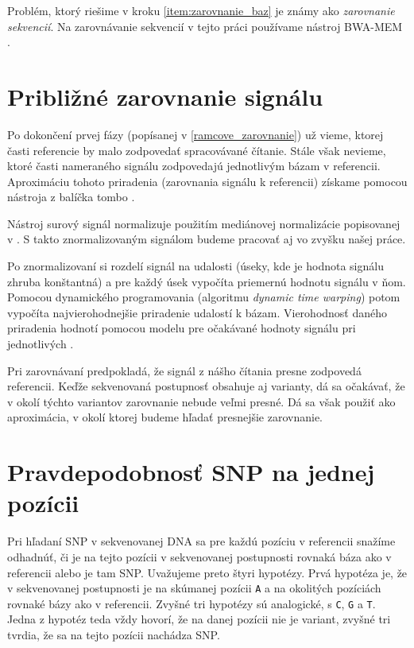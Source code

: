 Problém, ktorý riešime v kroku \ref{item:zarovnanie_baz} je známy ako
\emph{zarovnanie sekvencií}. Na zarovnávanie sekvencií v tejto práci používame
nástroj BWA-MEM \cite{BWA-MEM}.

\section{Približné zarovnanie signálu}
\label{sec:resquiggle}

Po dokončení prvej fázy (popísanej v \ref{ramcove_zarovnanie}) už vieme, ktorej časti referencie
by malo zodpovedať spracovávané čítanie. Stále však nevieme, ktoré časti nameraného signálu
zodpovedajú jednotlivým bázam v referencii. Aproximáciu tohoto priradenia (zarovnania signálu k 
referencii)
získame pomocou nástroja \resquiggle{} z balíčka tombo \cite{tombo}. 

Nástroj \resquiggle{} surový signál normalizuje použitím mediánovej normalizácie popisovanej 
v \cite{Stoiber2017}. S takto znormalizovaným signálom budeme pracovať aj vo zvyšku našej práce.

Po znormalizovaní si \resquiggle{} rozdelí signál na udalosti (úseky, kde je hodnota signálu zhruba
konštantná) a pre každý úsek vypočíta priemernú hodnotu signálu v ňom.
Pomocou dynamického programovania (algoritmu \emph{dynamic time warping}) potom vypočíta 
najvierohodnejšie priradenie udalostí k bázam. 
Vierohodnosť daného priradenia hodnotí pomocou modelu pre očakávané hodnoty signálu pri
jednotlivých  \cite{resquiggle}.


Pri zarovnávaní \resquiggle{} predpokladá, že signál z nášho čítania presne zodpovedá referencii.
Keďže sekvenovaná postupnosť obsahuje aj varianty, dá sa očakávať, že v okolí týchto variantov
zarovnanie nebude veľmi presné. Dá sa však použiť ako aproximácia, v okolí ktorej budeme hľadať
presnejšie zarovnanie.

\section{Pravdepodobnosť SNP na jednej pozícii}
\label{sec:jedna_pozicia}

Pri hľadaní SNP v sekvenovanej DNA sa pre každú pozíciu v referencii snažíme odhadnúť, či je
na tejto pozícii v sekvenovanej postupnosti rovnaká báza ako v referencii alebo je tam SNP. Uvažujeme
preto štyri hypotézy. Prvá hypotéza je, že v sekvenovanej postupnosti je na skúmanej
pozícii \texttt{A} a na okolitých pozíciách rovnaké bázy ako v referencii. Zvyšné tri hypotézy sú
analogické, s \texttt{C}, \texttt{G} a \texttt{T}. Jedna z hypotéz teda vždy hovorí, že na danej
pozícii nie je variant, zvyšné tri tvrdia, že sa na tejto pozícii nachádza SNP.


